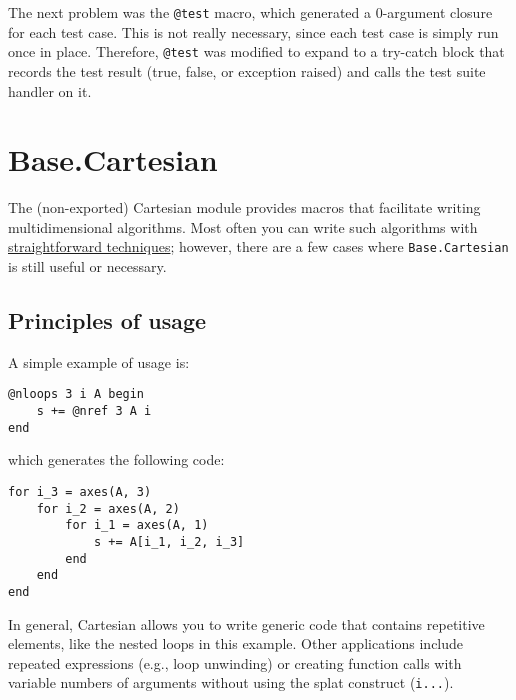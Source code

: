 The next problem was the \texttt{@test} macro, which generated a 0-argument closure for each test case. This is not really necessary, since each test case is simply run once in place. Therefore, \texttt{@test} was modified to expand to a try-catch block that records the test result (true, false, or exception raised) and calls the test suite handler on it.



\hypertarget{3147327615803034601}{}


\section{Base.Cartesian}



The (non-exported) Cartesian module provides macros that facilitate writing multidimensional algorithms. Most often you can write such algorithms with \href{https://julialang.org/blog/2016/02/iteration}{straightforward techniques}; however, there are a few cases where \texttt{Base.Cartesian} is still useful or necessary.



\hypertarget{10560451956896766301}{}


\subsection{Principles of usage}



A simple example of usage is:




\begin{verbatim}
@nloops 3 i A begin
    s += @nref 3 A i
end
\end{verbatim}



which generates the following code:




\begin{verbatim}
for i_3 = axes(A, 3)
    for i_2 = axes(A, 2)
        for i_1 = axes(A, 1)
            s += A[i_1, i_2, i_3]
        end
    end
end
\end{verbatim}



In general, Cartesian allows you to write generic code that contains repetitive elements, like the nested loops in this example.  Other applications include repeated expressions (e.g., loop unwinding) or creating function calls with variable numbers of arguments without using the {\textquotedbl}splat{\textquotedbl} construct (\texttt{i...}).



